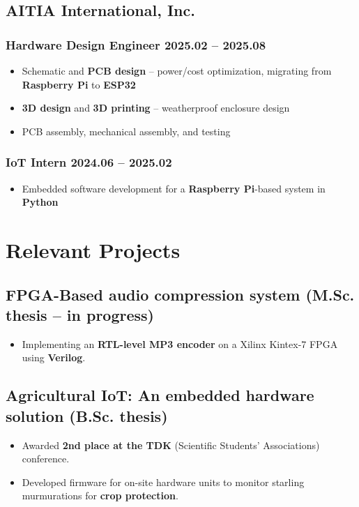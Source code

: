 \documentclass{article}
\newcommand{\rside}[1]{\hfill \normalfont\scshape\MakeLowercase{#1}}
\begin{document}
\subsection{AITIA International, Inc.}
\vspace{2pt}
\subsubsection{Hardware Design Engineer \rside{2025.02 -- 2025.08}}
\begin{itemize}
  \item Schematic and \textbf{PCB design} -- power/cost optimization, migrating from \textbf{Raspberry Pi} to \textbf{ESP32}
  \item \textbf{3D design} and \textbf{3D printing} -- weatherproof enclosure design
  \item PCB assembly, mechanical assembly, and testing
\end{itemize}
\subsubsection{IoT Intern \rside{2024.06 -- 2025.02}}
\begin{itemize}
  \item Embedded software development for a \textbf{Raspberry Pi}-based system in \textbf{Python}
\end{itemize}


\section{\faFlask\enspace Relevant Projects}
\subsection{FPGA-Based audio compression system (M.Sc. thesis -- in progress)}
\begin{itemize}
  \item Implementing an \textbf{RTL-level MP3 encoder} on a Xilinx Kintex-7 FPGA using \textbf{Verilog}.
\end{itemize}

\subsection{Agricultural IoT: An embedded hardware solution (B.Sc. thesis)}
\begin{itemize}
  \item Awarded \textbf{2nd place at the TDK} (Scientific Students' Associations) conference.
  \item Developed firmware for on-site hardware units to monitor starling murmurations for \textbf{crop protection}.
\end{itemize}
\end{document}
